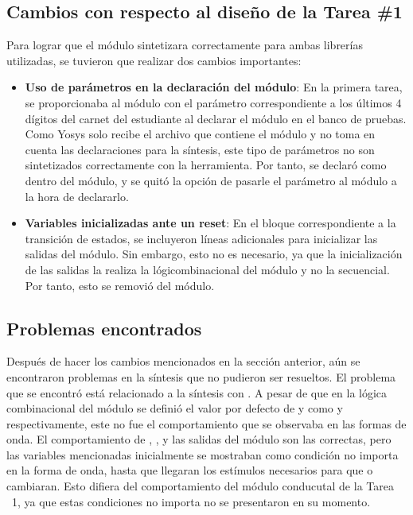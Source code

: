 \subsection{Cambios con respecto al diseño de la Tarea \#1}
Para lograr que el módulo  sintetizara correctamente para ambas librerías utilizadas, se tuvieron que realizar dos cambios importantes:
\begin{itemize}
    \item \textbf{Uso de parámetros en la declaración del módulo}: En la primera tarea, se proporcionaba al módulo con el parámetro  correspondiente a los últimos 4 dígitos del carnet del estudiante al declarar el módulo en el banco de pruebas. Como Yosys solo recibe el archivo que contiene el módulo y no toma en cuenta las declaraciones para la síntesis, este tipo de parámetros no son sintetizados correctamente con la herramienta. Por tanto,  se declaró como  dentro del módulo, y se quitó la opción de pasarle el parámetro  al módulo a la hora de declararlo. 
    \item \textbf{Variables inicializadas ante un reset}: En el bloque  correspondiente a la transición de estados, se incluyeron líneas adicionales para inicializar las salidas del módulo. Sin embargo, esto no es necesario, ya que la inicialización de las salidas la realiza la lógicombinacional del módulo y no la secuencial. Por tanto, esto se removió del módulo. 
\end{itemize}

\subsection{Problemas encontrados}
Después de hacer los cambios mencionados en la sección anterior, aún se encontraron problemas en la síntesis que no pudieron ser resueltos. 
El problema que se encontró está relacionado a la síntesis con . 
A pesar de que en la lógica combinacional del módulo se definió el valor por defecto de  y  como  y  respectivamente, este no fue el comportamiento que se observaba en las formas de onda. El comportamiento de , , y las salidas del módulo son las correctas, pero las variables mencionadas inicialmente se mostraban como condición no importa en la forma de onda, hasta que llegaran los estímulos necesarios para que  o  cambiaran. Esto difiera del comportamiento del módulo conducutal de la Tarea \ 1, ya que estas condiciones no importa no se presentaron en su momento.

